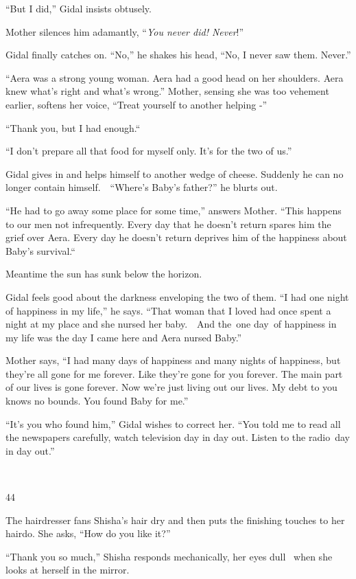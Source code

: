 \documentclass[twoside,11pt]{book}
\begin{document}
``But I did,'' Gidal insists obtusely.\ 

Mother silences him adamantly, ``\textit{You never did! Never}!'' 

Gidal finally catches on. ``No,'' he shakes his head, ``No, I never saw them. Never.'' 

``Aera was a strong young woman. Aera had a good head on her shoulders. Aera knew what's right and what's
wrong.'' Mother, sensing she was too vehement earlier, softens her voice, ``Treat yourself to
another helping -'' 

``Thank you, but I had enough.``\ 

``I don't prepare all that food for myself only. It's for the two of us.''

Gidal gives in and helps himself to another wedge of cheese. Suddenly he can no longer contain
himself.\ \ ``Where's Baby's father?'' he blurts out.

``He had to go away some place for some time,'' answers Mother. ``This happens to
our men not infrequently. Every day that he doesn't return spares him the grief over Aera. Every day he doesn't return
deprives him of the happiness about Baby's survival.``\ 

Meantime the sun has sunk below the horizon. 

Gidal feels good about the darkness enveloping the two of them. ``I had one night of happiness in my
life,'' he says. ``That woman that I loved had once spent a night at my place and she nursed
her baby.\ \ And the{\ }one day\textit{\ }of happiness in my life was the day I
came here and Aera nursed Baby.'' 

Mother says, ``I had many days of happiness and many nights of happiness, but they're all gone for me
forever. Like they're gone for you forever. The main part of our lives is gone forever. Now we're just living out our
lives. My debt to you knows no bounds. You found Baby for me.'' 

``It's you who found him,'' Gidal wishes to correct her. ``You told me to read
all the newspapers carefully, watch television day in day out. Listen to the radio{\ }day in day
out.''

~

44 

The hairdresser fans Shisha's hair dry and then puts the finishing touches to her hairdo. She asks, ``How
do you like it?'' 

``Thank you so much,'' Shisha responds mechanically, her eyes dull ~when she looks at herself
in the mirror. 
\end{document}
